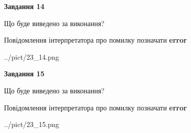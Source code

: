 \documentclass[11pt, ukrainian]{article}
\begin{document}
{\begin {large}
{\begin {center}\textbf{Завдання 14}\end {center}}\par
Що буде виведено за виконання? \par
Повідомлення інтерпретатора про помилку позначати \textbf{error}

\begin{center}
	{../pict/23_14.png}
\end{center}
\newpage

{\begin {center}\textbf{Завдання 15}\end {center}}\par
Що буде виведено за виконання? \par
Повідомлення інтерпретатора про помилку позначати \textbf{error}

\begin{center}
	{../pict/23_15.png}
\end{center}
\newpage

\end {large}}
\end{document}
